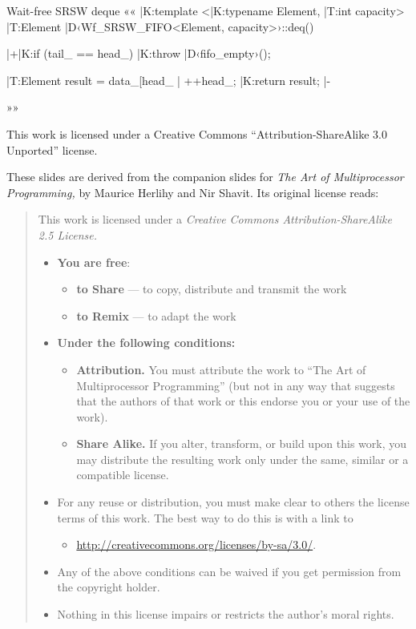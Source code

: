 \documentclass{beamer}
\begin{document}
\begin{frame}[fragile]{Wait-free SRSW deque}{}
  ««
  |K:template <|K:typename Element, |T:int capacity>
  |T:Element |D‹Wf_SRSW_FIFO<Element, capacity>›::deq()
  {
    	|+|K:if (tail_ == head_) |K:throw |D‹fifo_empty›();

    |T:Element result = data_[head_ |%
    ++head_;
    |K:return result; |-
  }
  »»
\end{frame}
\begin{frame}{}{}
\vskip4pt
\parskip=4pt
\scriptsize
This work is licensed under a Creative Commons “Attribution-ShareAlike
3.0 Unported” license.

These slides are derived from the companion slides for \emph{The Art of
Multiprocessor Programming,} by Maurice Herlihy and Nir Shavit. Its
original license reads:
\begin{quote}
  This work is licensed under a \emph{Creative Commons Attribution-ShareAlike
  2.5 License.}
\begin{itemize}
  \item \textbf{You are free}:
    \begin{itemize}
      \item\tiny \textbf{to Share} — to copy, distribute and transmit the work
        \item\tiny \textbf{to Remix} — to adapt the work
    \end{itemize}
  \item \textbf{Under the following conditions:}
    \begin{itemize}
      \item\tiny \textbf{Attribution.} You must attribute the work to “The Art of
        Multiprocessor Programming” (but not in any way that suggests
        that the authors of that work or this endorse you or your use of
        the work).
      \item\tiny \textbf{Share Alike.} If you alter, transform, or build upon this work,
        you may distribute the resulting work only under the same,
        similar or a compatible license.
    \end{itemize}
  \item For any reuse or distribution, you must make clear to others the
    license terms of this work. The best way to do this is with a link to
    \begin{itemize}
      \item\tiny \url{http://creativecommons.org/licenses/by-sa/3.0/}.
    \end{itemize}
  \item Any of the above conditions can be waived if you get permission from
    the copyright holder.
  \item Nothing in this license impairs or restricts the author’s moral
    rights.
\end{itemize}
\end{quote}
\end{frame}
\end{document}
